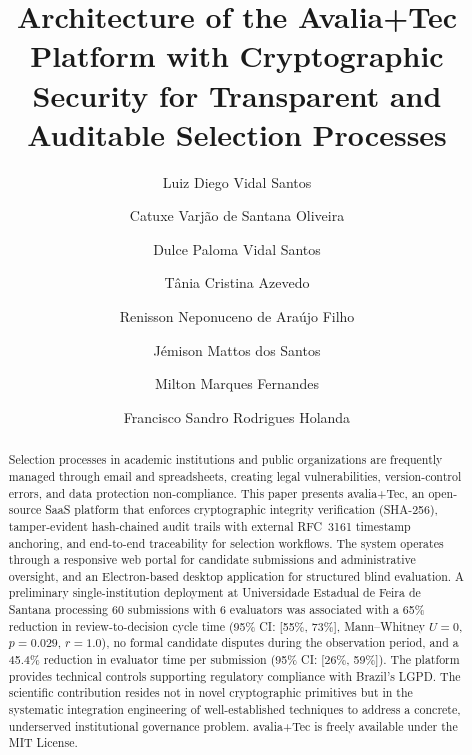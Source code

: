 \documentclass[preprint,12pt,a4paper]{elsarticle}
\begin{document}
\renewcommand{\labelenumii}{\arabic{enumi}.\arabic{enumii}}

\begin{frontmatter}

\title{Architecture of the Avalia+Tec Platform with Cryptographic Security for Transparent and Auditable Selection Processes}

\author[label1]{Luiz Diego Vidal Santos}
\author[label2]{Catuxe Varjão de Santana Oliveira}
\author[label4]{Dulce Paloma Vidal Santos}
\author[label1]{Tânia Cristina Azevedo}
\author[label3]{Renisson Neponuceno de Araújo Filho}
\author[label5]{Jémison Mattos dos Santos}
\author[label6]{Milton Marques Fernandes}
\author[label7]{Francisco Sandro Rodrigues Holanda}

\address[label1]{Universidade Estadual de Feira de Santana, Departamento de Ciências Exatas, Feira de Santana, Brasil}
\address[label2]{Universidade Federal de Sergipe, Programa de Pós-Graduação em Ciência da Propriedade Intelectual, São Cristóvão, Brasil}
\address[label3]{Universidade Federal Rural de Pernambuco, Departamento de Engenharia Rural, Recife, Brasil}
\address[label4]{Universidade Tiradentes, Departamento de Direito, Aracaju, Brasil}
\address[label5]{Universidade Estadual de Santa Cruz, Ilhéus, Brasil}
\address[label6]{Universidade Federal de Sergipe, Departamento de Ciências Florestais, São Cristóvão, Brasil}
\address[label7]{Universidade Federal de Sergipe, Departamento de Engenharia Agronômica, São Cristóvão, Brasil}


\begin{abstract}
Selection processes in academic institutions and public organizations are frequently managed through email and spreadsheets, creating legal vulnerabilities, version-control errors, and data protection non-compliance. This paper presents avalia+Tec, an open-source SaaS platform that enforces cryptographic integrity verification (SHA-256), tamper-evident hash-chained audit trails with external RFC~3161 timestamp anchoring, and end-to-end traceability for selection workflows. The system operates through a responsive web portal for candidate submissions and administrative oversight, and an Electron-based desktop application for structured blind evaluation. A preliminary single-institution deployment at Universidade Estadual de Feira de Santana processing 60 submissions with 6 evaluators was associated with a 65\% reduction in review-to-decision cycle time (95\% CI: [55\%, 73\%], Mann--Whitney $U = 0$, $p = 0.029$, $r = 1.0$), no formal candidate disputes during the observation period, and a 45.4\% reduction in evaluator time per submission (95\% CI: [26\%, 59\%]). The platform provides technical controls supporting regulatory compliance with Brazil's LGPD. The scientific contribution resides not in novel cryptographic primitives but in the systematic integration engineering of well-established techniques to address a concrete, underserved institutional governance problem. avalia+Tec is freely available under the MIT License.
\end{abstract}


\end{frontmatter}
\end{document}
